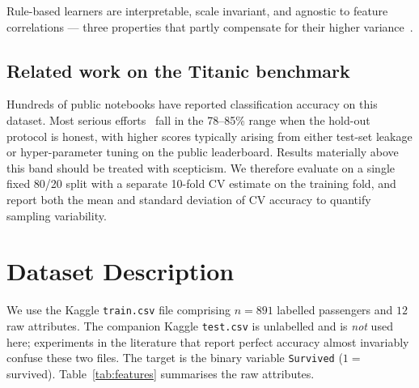 \documentclass[10pt,a4paper,twocolumn]{article}
\begin{document}
Rule-based learners are interpretable, scale invariant, and agnostic to feature
correlations --- three properties that partly compensate for their higher
variance~\cite{han2011data}.

\subsection{Related work on the Titanic benchmark}
Hundreds of public notebooks have reported classification accuracy on this dataset. Most
serious efforts~\cite{kaggle_titanic,hastie2009esl} fall in the 78--85\% range when the
hold-out protocol is honest, with higher scores typically arising from either test-set
leakage or hyper-parameter tuning on the public leaderboard. Results materially above
this band should be treated with scepticism. We therefore evaluate on a single fixed
80/20 split with a separate 10-fold CV estimate on the training fold, and report both
the mean and standard deviation of CV accuracy to quantify sampling variability.

\section{Dataset Description}\label{sec:dataset}
We use the Kaggle \texttt{train.csv} file comprising $n=891$ labelled passengers and $12$
raw attributes. The companion Kaggle \texttt{test.csv} is unlabelled and is \emph{not}
used here; experiments in the literature that report perfect accuracy almost invariably
confuse these two files. The target is the binary variable \texttt{Survived} ($1 =$
survived). Table~\ref{tab:features} summarises the raw attributes.
\end{document}
